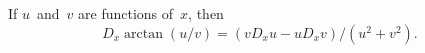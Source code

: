 If $u$~and~$v$ are functions of~$x$, then
\[
D_{x} \arctan(u/v) = (vD_{x}u - uD_{x}v)/(u^{2} + v^{2}).
\]



